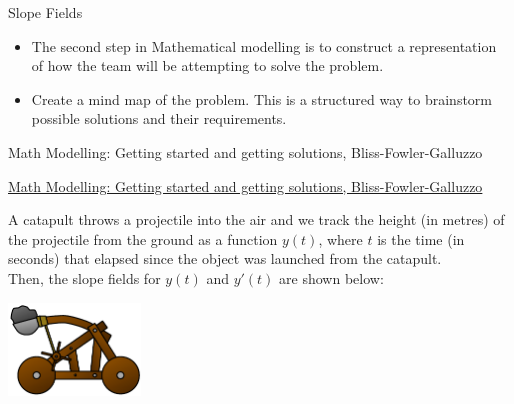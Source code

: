 \standardonlynewpage



%
%



\begin{module}{Slope Fields}
	\label{ODE:slopefields}

	
	
\end{module}



\begin{lesson}

	\begin{itemize}
		\item The second step in Mathematical modelling is to construct a representation of how the team will be attempting to solve the problem.
		\item Create a mind map of the problem. This is a structured way to brainstorm possible solutions and their requirements.
	\end{itemize}
	

\begin{annotation}
	\begin{goals}
	Math Modelling: Getting started and getting solutions, Bliss-Fowler-Galluzzo
	
	\hfill {}	
	\end{goals}
\end{annotation}
	 \href{https://m3challenge.siam.org/resources/modeling-handbook}{Math Modelling: Getting started and getting solutions, Bliss-Fowler-Galluzzo}

\end{lesson}





\question
\begin{minipage}{.7\textwidth}
	A catapult throws a projectile into the air and we track the height (in metres) of the projectile from the ground as a function $y(t)$, where $t$ is the time (in seconds) that elapsed since the object was launched from the catapult. \\

	Then, the slope fields for $y(t)$ and $y'(t)$ are shown below:
\end{minipage}\hfill
\begin{minipage}{100pt}
	\includegraphics*[width=100pt]{images/module9-catapult.pdf}	
\end{minipage}






